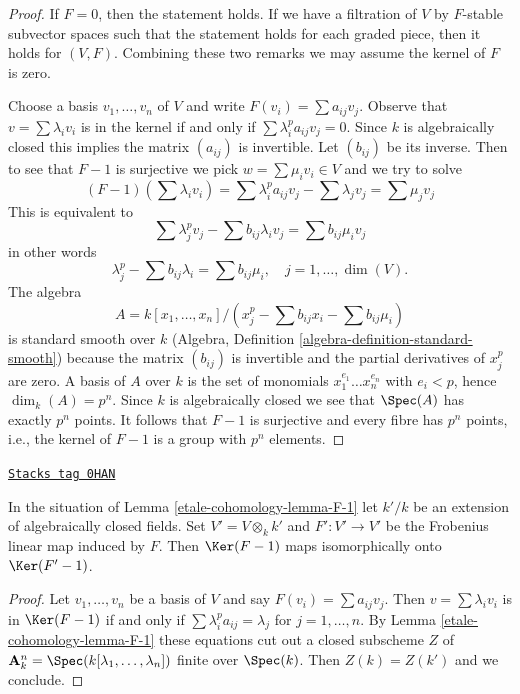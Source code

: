\begin{proof}
If $F = 0$, then the statement holds. If we have a filtration of $V$ by
$F$-stable subvector spaces such that the statement holds for each
graded piece, then it holds for $(V, F)$. Combining these two remarks
we may assume the kernel of $F$ is zero.

\medskip\noindent
Choose a basis $v_1, \ldots, v_n$ of $V$ and write
$F(v_i) = \sum a_{ij} v_j$. Observe that $v = \sum \lambda_i v_i$
is in the kernel if and only if $\sum \lambda_i^p a_{ij} v_j = 0$.
Since $k$ is algebraically closed this implies the matrix $(a_{ij})$
is invertible. Let $(b_{ij})$ be its inverse. Then to see that $F - 1$
is surjective we pick $w = \sum \mu_i v_i \in V$ and we try to solve
$$
(F - 1)(\sum \lambda_iv_i) =
\sum \lambda_i^p a_{ij} v_j - \sum \lambda_j v_j = \sum \mu_j v_j
$$
This is equivalent to
$$
\sum \lambda_j^p v_j - \sum b_{ij} \lambda_i v_j = \sum b_{ij} \mu_i v_j
$$
in other words
$$
\lambda_j^p - \sum b_{ij} \lambda_i = \sum b_{ij} \mu_i,
\quad j = 1, \ldots, \dim(V).
$$
The algebra
$$
A = k[x_1, \ldots, x_n]/
(x_j^p - \sum b_{ij} x_i - \sum b_{ij} \mu_i)
$$
is standard smooth over $k$
(Algebra, Definition \ref{algebra-definition-standard-smooth})
because the matrix $(b_{ij})$ is invertible and the partial derivatives
of $x_j^p$ are zero. A basis of $A$ over $k$ is the set of monomials
$x_1^{e_1} \ldots x_n^{e_n}$ with $e_i < p$, hence $\dim_k(A) = p^n$.
Since $k$ is algebraically closed we see that $\Spec(A)$ has exactly
$p^n$ points. It follows that $F - 1$ is surjective and every fibre
has $p^n$ points, i.e., the kernel of $F - 1$ is a group with $p^n$ elements.
\end{proof}

\begin{lemma}[F 2]
\label{etale-cohomology-lemma-F-2}
\href{https://stacks.math.columbia.edu/tag/0HAN}{\texttt{Stacks tag 0HAN}}

In the situation of Lemma \ref{etale-cohomology-lemma-F-1} let $k'/k$ be an extension
of algebraically closed fields. Set $V' = V \otimes_k k'$ and
$F' : V' \to V'$ be the Frobenius linear map induced by $F$.
Then $\Ker(F - 1)$ maps isomorphically onto $\Ker(F' - 1)$.
\end{lemma}

\begin{proof}
Let $v_1, \ldots, v_n$ be a basis of $V$ and say $F(v_i) = \sum a_{ij}v_j$.
Then $v = \sum \lambda_i v_i$ is in $\Ker(F - 1)$ if and only if
$\sum \lambda_i^pa_{ij} = \lambda_j$ for $j = 1, \ldots, n$.
By Lemma \ref{etale-cohomology-lemma-F-1} these equations
cut out a closed subscheme $Z$ of
$\mathbf{A}^n_k = \Spec(k[\lambda_1, \ldots, \lambda_n])$
finite over $\Spec(k)$. Then $Z(k) = Z(k')$ and we conclude.
\end{proof}

